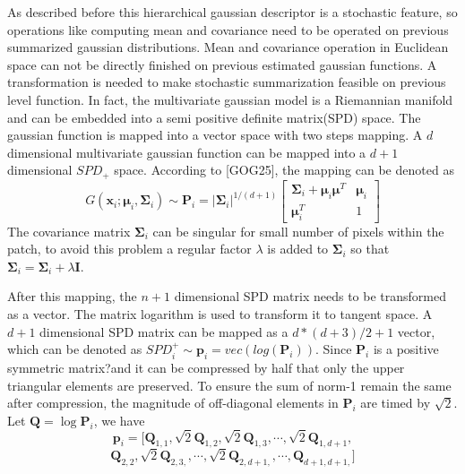As described before this hierarchical gaussian descriptor is a stochastic feature, so operations like computing mean and covariance need to be operated on previous summarized gaussian distributions. Mean and covariance operation in Euclidean space can not be directly finished on previous estimated gaussian functions. A transformation is needed to make stochastic summarization feasible on previous level function.
In fact, the multivariate gaussian model is a Riemannian manifold and can be embedded into a semi positive definite matrix(SPD) space. The gaussian function is mapped into a vector space with two steps mapping. A $d$ dimensional multivariate gaussian function can be mapped into a $d+1$ dimensional $SPD_+$ space. According to [GOG25], the mapping can be denoted as 
\begin{equation}
G(\bm{x}_i;\bm{\mu}_i,\bm{\Sigma}_i) \sim \bm{P}_i  = |\bm{\Sigma}_i|^{1/(d+1)} \left[ \begin{matrix}
\bm{\Sigma}_i + \bm{\mu}_i\bm{\mu}^T & \bm{\mu}_i \\
\bm{\mu}_i^T & 1
\end{matrix}
\right]
\end{equation}
The covariance matrix $\bm{\Sigma}_i$ can be singular for small number of pixels within the patch, to avoid this problem a regular factor $\lambda$ is added to $\bm{\Sigma}_i$ so that $\bm{\Sigma}_i = \bm{\Sigma}_i + \lambda\bm{I}$. 

After this mapping, the $n+1$ dimensional SPD matrix needs to be transformed as a vector. The matrix logarithm is used to transform it to tangent space. A $d+1$ dimensional SPD matrix can be mapped as a $d*(d+3)/2+1$ vector, which can be denoted as $SPD_i^+ \sim \bm{p}_i = vec(log(\bm{P}_i))$. Since $\bm{P}_i$ is a positive symmetric matrix?and it can be compressed by half that only the upper triangular 
elements are preserved. To ensure the sum of norm-1 remain the same after compression, the magnitude of off-diagonal elements in $\bm{P}_i$ are timed by $\sqrt2$.  Let $\bm{Q}=\log{\bm{P}_i}$, we have
\begin{equation}
 \bm{p}_i = [\bm{Q}_{1,1},\sqrt2\bm{Q}_{1,2},\sqrt2\bm{Q}_{1,3},\cdots,\sqrt2\bm{Q}_{1,d+1},
 \end{equation}
 \begin{equation}
 \bm{Q}_{2,2},\sqrt2\bm{Q}_{2,3,},\cdots,\sqrt2\bm{Q}_{2,d+1,},\cdots,\bm{Q}_{d+1,d+1,}]
\end{equation}

